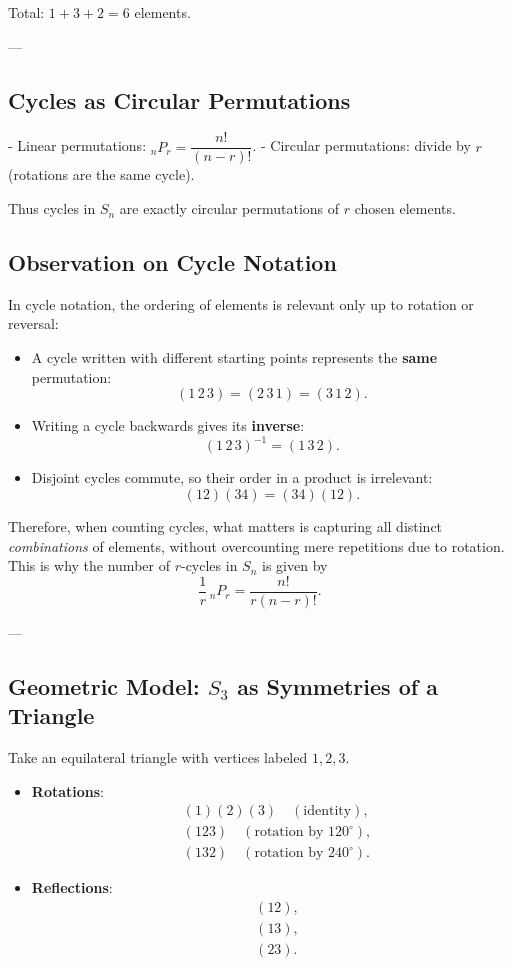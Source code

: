 \documentclass[12pt]{article}
\begin{document}
	Total: $1+3+2 = 6$ elements.
	
	---
	
	\subsection*{Cycles as Circular Permutations}
	- Linear permutations: ${}_nP_r = \dfrac{n!}{(n-r)!}$.  
	- Circular permutations: divide by $r$ (rotations are the same cycle).  
	
	Thus cycles in $S_n$ are exactly circular permutations of $r$ chosen elements.
	
	\subsection*{Observation on Cycle Notation}
	
	In cycle notation, the ordering of elements is relevant only up to rotation or reversal:
	
	\begin{itemize}
		\item A cycle written with different starting points represents the \textbf{same} permutation:
		$$
		(1\,2\,3) = (2\,3\,1) = (3\,1\,2).
		$$
		\item Writing a cycle backwards gives its \textbf{inverse}:
		$$
		(1\,2\,3)^{-1} = (1\,3\,2).
		$$
		\item Disjoint cycles commute, so their order in a product is irrelevant:
		$$
		(12)(34) = (34)(12).
		$$
	\end{itemize}
	
	Therefore, when counting cycles, what matters is capturing all distinct \emph{combinations} of elements, without overcounting mere repetitions due to rotation. This is why the number of $r$-cycles in $S_n$ is given by
	$$
	\frac{1}{r}\, {}_nP_r = \frac{n!}{r (n-r)!}.
	$$
	
	
	---
	
	\subsection*{Geometric Model: $S_3$ as Symmetries of a Triangle}
	Take an equilateral triangle with vertices labeled $1,2,3$.  
	
	\begin{itemize}
		\item \textbf{Rotations}:
		\begin{align*}
			& (1)(2)(3) \quad (\text{identity}), \\
			& (123) \quad (\text{rotation by } 120^\circ), \\
			& (132) \quad (\text{rotation by } 240^\circ).
		\end{align*}
		\item \textbf{Reflections}:
		\begin{align*}
			& (12), \\
			& (13), \\
			& (23).
		\end{align*}
	\end{itemize}
	
\end{document}

